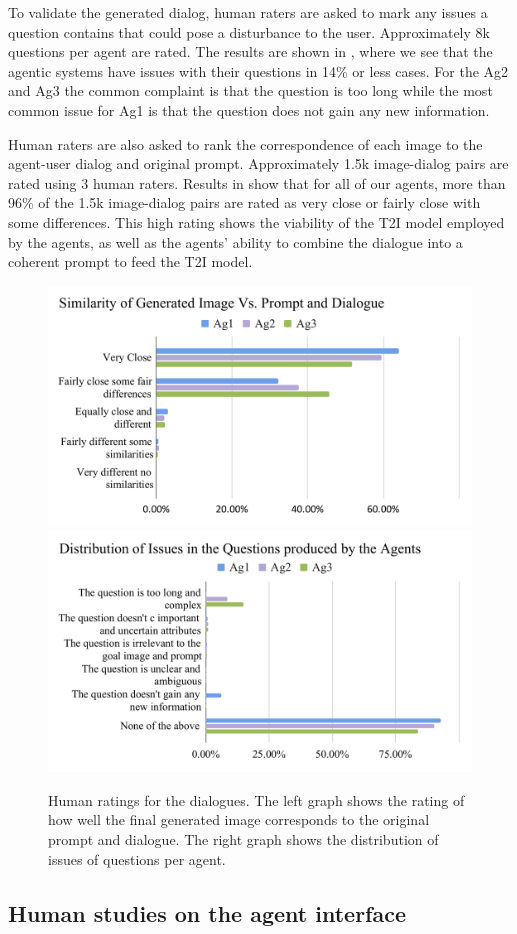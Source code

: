 To validate the generated dialog, human raters are asked to mark any issues a question contains that could pose a disturbance to the user. Approximately 8k questions per agent are rated. The results are shown in , where we see that the agentic systems have issues with their questions in 14\% or less cases. For the Ag2 and Ag3 the common complaint is that the question is too long while the most common issue for Ag1 is that the question does not gain any new information. 


Human raters are also asked to rank the correspondence of each image to the agent-user dialog and original prompt. Approximately 1.5k image-dialog pairs are rated using 3 human raters. Results in  show that for all of our agents, more than 96\% of the 1.5k image-dialog pairs are rated as very close or fairly close with some differences. This high rating shows the viability of the T2I model employed by the agents, as well as the agents' ability to combine the dialogue into a coherent prompt to feed the T2I model. 

\begin{figure}
    \centering
    \includegraphics[width=.45\textwidth]{figures/Correspondence_Dialogue.pdf}
    \includegraphics[width=.45\textwidth]{figures/Distribution_Agents.pdf}
    \caption{Human ratings for the dialogues. The left graph shows the rating of how well the final generated image corresponds to the original prompt and dialogue. The right graph shows the distribution of issues of questions per agent.}
    \label{fig:rating_human_dialog}
\end{figure}

\subsection{Human studies on the agent interface}

